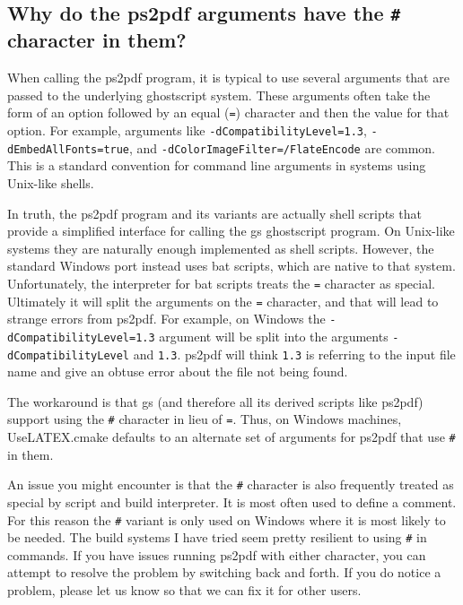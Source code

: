\documentclass{article}
\newcommand*{\textfile}[1]{\textsf{#1}}
\newcommand*{\textprog}[1]{\textfile{#1}}
\newcommand*{\textcmake}[1]{\texttt{#1}}
\newcommand*{\UseLATEX}{\textfile{UseLATEX.cmake}\xspace}
\begin{document}
  \subsection{Why do the \textprog{ps2pdf} arguments have the \textcmake{\#} character in them?}
  \label{sec:Why_do_the_ps2pdf_arguments_have_the_hash_character_in_them}

  When calling the \textprog{ps2pdf} program, it is typical to use several arguments that are passed to the underlying ghostscript system.
  These arguments often take the form of an option followed by an equal (\textcmake{=}) character and then the value for that option.
  For example, arguments like \mbox{\textcmake{-dCompatibilityLevel=1.3}}, \mbox{\textcmake{-dEmbedAllFonts=true}}, and \mbox{\textcmake{-dColorImageFilter=/FlateEncode}} are common.
  This is a standard convention for command line arguments in systems using Unix-like shells.

  In truth, the \textprog{ps2pdf} program and its variants are actually shell scripts that provide a simplified interface for calling the \textprog{gs} ghostscript program.
  On Unix-like systems they are naturally enough implemented as shell scripts.
  However, the standard Windows port instead uses \textprog{bat} scripts, which are native to that system.
  Unfortunately, the interpreter for \textprog{bat} scripts treats the \textcmake{=} character as special.
  Ultimately it will split the arguments on the \textcmake{=} character, and that will lead to strange errors from \textprog{ps2pdf}.
  For example, on Windows the \mbox{\textcmake{-dCompatibilityLevel=1.3}} argument will be split into the arguments \mbox{\textcmake{-dCompatibilityLevel}} and \mbox{\textcmake{1.3}}.
  \textprog{ps2pdf} will think \mbox{\textcmake{1.3}} is referring to the input file name and give an obtuse error about the file not being found.

  The workaround is that \textprog{gs} (and therefore all its derived scripts like \textprog{ps2pdf}) support using the \textcmake{\#} character in lieu of \textcmake{=}.
  Thus, on Windows machines, \UseLATEX defaults to an alternate set of arguments for \textprog{ps2pdf} that use \textcmake{\#} in them.

  An issue you might encounter is that the \textcmake{\#} character is also frequently treated as special by script and build interpreter.
  It is most often used to define a comment.
  For this reason the \textcmake{\#} variant is only used on Windows where it is most likely to be needed.
  The build systems I have tried seem pretty resilient to using \textcmake{\#} in commands.
  If you have issues running \textprog{ps2pdf} with either character, you can attempt to resolve the problem by switching back and forth.
  If you do notice a problem, please let us know so that we can fix it for other users.
\end{document}
